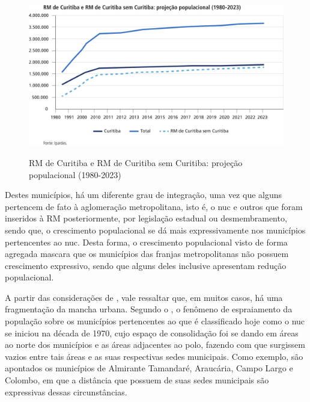 	\begin{figure}
		\centering
		\caption{RM de Curitiba e RM de Curitiba sem Curitiba: projeção populacional (1980-2023)}
		\includegraphics[width=1.0\linewidth]{img/costa2015a_02}
		\label{fig:costa2015a_02}
	\end{figure}
	
	Destes municípios, há um diferente grau de integração, uma vez que alguns pertencem de fato à aglomeração metropolitana, isto é, o \gls{nuc} e outros que foram inseridos à RM posteriormente, por legislação estadual ou desmembramento, sendo que, o crescimento populacional se dá mais expressivamente nos municípios pertencentes ao \gls{nuc}. Desta forma, o crescimento populacional visto de forma agregada mascara que os municípios das franjas metropolitanas não possuem crescimento expressivo, sendo que alguns deles inclusive apresentam redução populacional.
	
	A partir das considerações de , vale ressaltar que, em muitos casos, há uma fragmentação da mancha urbana. Segundo o , o fenômeno de espraiamento da população sobre os municípios pertencentes ao que é classificado hoje como o \gls{nuc} se iniciou na década de 1970, cujo espaço de consolidação foi se dando em áreas ao norte dos municípios e as áreas adjacentes ao polo, fazendo com que surgissem vazios entre tais áreas e as suas respectivas sedes municipais. Como exemplo, são apontados os municípios de Almirante Tamandaré, Araucária, Campo Largo e Colombo, em que a distância que possuem de suas sedes municipais são expressivas dessas circunstâncias.
	
